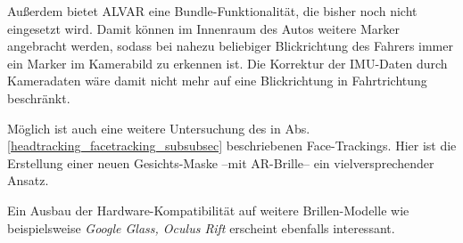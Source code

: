Außerdem bietet ALVAR eine Bundle-Funktionalität, die bisher noch nicht eingesetzt wird.
Damit können im Innenraum des Autos weitere Marker angebracht werden, sodass bei nahezu beliebiger Blickrichtung des Fahrers immer ein Marker im Kamerabild zu erkennen ist.
Die Korrektur der \ac{IMU}-Daten durch Kameradaten wäre damit nicht mehr auf eine Blickrichtung in Fahrtrichtung beschränkt.

Möglich ist auch eine weitere Untersuchung des in Abs. \ref{headtracking_facetracking_subsubsec} beschriebenen Face-Trackings.
Hier ist die Erstellung einer neuen Gesichts-Maske --mit \ac{AR}-Brille-- ein vielversprechender Ansatz. 

Ein Ausbau der Hardware-Kompatibilität auf weitere Brillen-Modelle wie beispielsweise \emph{Google Glass, Oculus Rift} \oae erscheint ebenfalls interessant.


